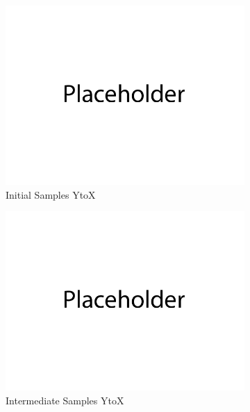 \documentclass{article}
\begin{document}
\begin{figure}[H]
         \begin{subfigure}[b]{0.32\textwidth}
             \centering
             \includegraphics[width=\textwidth]{figures/q2_initial_samples_yx.png}
             \caption{Initial Samples YtoX}
         \end{subfigure}
         \hfill
         \begin{subfigure}[b]{0.32\textwidth}
             \centering
             \includegraphics[width=\textwidth]{figures/q2_intermediate_samples_yx.png}
             \caption{Intermediate Samples YtoX}
         \end{subfigure}
         \hfill
         \begin{subfigure}[b]{0.32\textwidth}
             \centering

\end{subfigure}
\end{figure}
\end{document}
